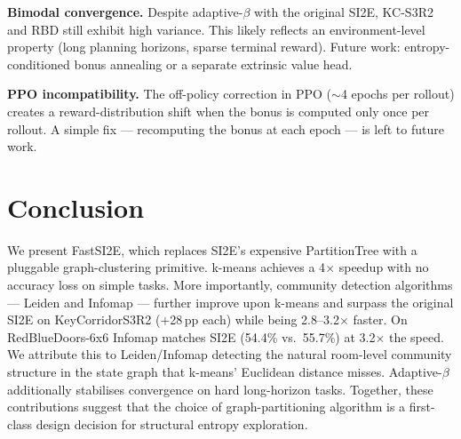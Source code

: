 \documentclass[10pt,twocolumn]{article}
\newcommand{\fastsi}{FastSI2E}
\newcommand{\si}{SI2E}
\newcommand{\ptree}{PartitionTree}
\begin{document}
\textbf{Bimodal convergence.}
Despite adaptive-$\beta$ with the original \si{}, KC-S3R2 and RBD still exhibit
high variance. This likely reflects an environment-level property (long planning
horizons, sparse terminal reward). Future work: entropy-conditioned bonus
annealing or a separate extrinsic value head.

\textbf{PPO incompatibility.}
The off-policy correction in PPO ($\sim$4 epochs per rollout) creates a
reward-distribution shift when the bonus is computed only once per rollout.
A simple fix --- recomputing the bonus at each epoch --- is left to future work.

\section{Conclusion}

We present \fastsi{}, which replaces \si{}'s expensive \ptree{} with a pluggable
graph-clustering primitive. k-means achieves a 4$\times$ speedup with no
accuracy loss on simple tasks. More importantly, community detection algorithms
--- Leiden and Infomap --- further improve upon k-means and surpass the original
\si{} on KeyCorridorS3R2 ($+$28\,pp each) while being 2.8--3.2$\times$ faster.
On RedBlueDoors-6x6 Infomap matches SI2E (54.4\% vs.\ 55.7\%) at 3.2$\times$
the speed.
We attribute this to Leiden/Infomap detecting the natural room-level community
structure in the state graph that k-means' Euclidean distance misses.
Adaptive-$\beta$ additionally stabilises convergence on hard long-horizon tasks.
Together, these contributions suggest that the choice of graph-partitioning
algorithm is a first-class design decision for structural entropy exploration.



\end{document}

